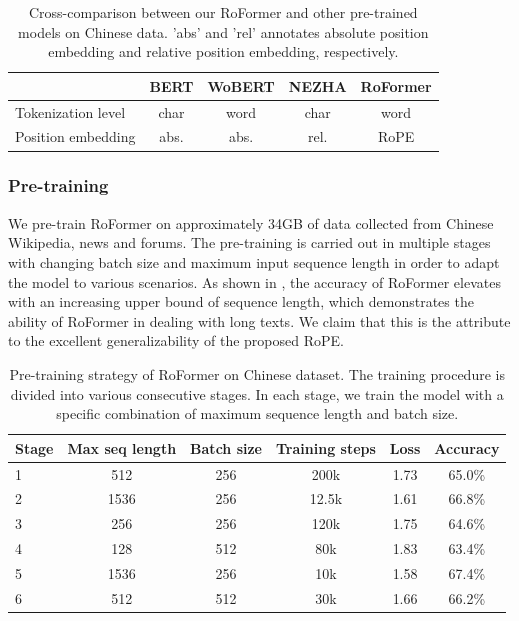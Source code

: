 \documentclass{article}
\begin{document}
\begin{table}[h]
	\caption{Cross-comparison between our RoFormer and other pre-trained models on Chinese data. 'abs' and 'rel' annotates absolute position embedding and relative position embedding, respectively. } 
	\label{tb:roformer-tokpos-imp}
	\centering 
	\begin{tabular}{lcccc}
		\toprule
		\makecell[c]{Model} & BERT\cite{Devlin2019BERTPO} & WoBERT\cite{zhuiyipretrainedmodels} & NEZHA\cite{nezha} & RoFormer \\
		\midrule
		Tokenization level & char & word & char & word \\
		Position embedding & abs. & abs. & rel. & RoPE \\ 
		\bottomrule
	\end{tabular}
\end{table}

\subsubsection{Pre-training} 
We pre-train RoFormer on approximately 34GB of data collected from Chinese Wikipedia, news and forums. The pre-training is carried out in multiple stages with changing batch size and maximum input sequence length in order to adapt the model to various scenarios. As shown in , the accuracy of RoFormer elevates with an increasing upper bound of sequence length, which demonstrates the ability of RoFormer in dealing with long texts. We claim that this is the attribute to the excellent generalizability of the proposed RoPE.  

\begin{table}[hbt]
	\caption{Pre-training strategy of RoFormer on Chinese dataset. The training procedure is divided into various consecutive stages. In each stage, we train the model with a specific combination of maximum sequence length and batch size. }
	\label{tb:roformer-pretrain}
	\centering
	\begin{tabular}{lccccc}
		\toprule
		Stage & Max seq length & Batch size & Training steps & Loss & Accuracy \\ 
		\midrule
		1 & 512 &  256 & 200k & 1.73 & 65.0\% \\ 
		2 & 1536 & 256 & 12.5k & 1.61 & 66.8\% \\ 
		3 & 256 & 256 & 120k & 1.75 & 64.6\% \\ 
		4 & 128 & 512 & 80k & 1.83 & 63.4\% \\ 
		5 & 1536 & 256 & 10k & 1.58 & 67.4\% \\ 
		6 & 512 & 512 & 30k & 1.66 & 66.2\% \\ 
		\bottomrule
	\end{tabular}
\end{table}
\end{document}
